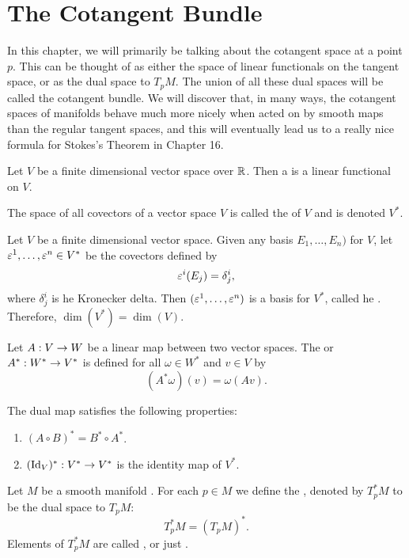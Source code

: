 \newpage\setcounter{section}{10}
\section{The Cotangent Bundle}

In this chapter, we will primarily be talking about the cotangent space at a point $p$. This can be thought of as either the space of linear functionals on the tangent space, or as the dual space to $T_pM$. The union of all these dual spaces will be called the cotangent bundle. We will discover that, in many ways, the cotangent spaces of manifolds behave much more nicely when acted on by smooth maps than the regular tangent spaces, and this will eventually lead us to a really nice formula for Stokes's Theorem in Chapter 16.


\dfn Let $V$ be a finite dimensional vector space over $\mathbb{R}$. Then a  is a linear functional on $V$.

\dfn The space of all covectors of a vector space $V$ is called the  of $V$ and is denoted $V^*$.

\begin{prop}
Let $V$ be a finite dimensional vector space. Given any basis $E_1,\ldots,E_n)$ for $V$, let $\varepsilon^1,\ldots,\varepsilon^n\in V^*$ be the covectors defined by
\[\varepsilon^i(E_j) = \delta^i_j,\]
where $\delta^i_j$ is he Kronecker delta. Then $(\varepsilon^1,\ldots,\varepsilon^n)$ is a basis for $V^*$, called he . Therefore, $\dim(V^*) = \dim(V)$.
\end{prop}

\dfn Let $A:V\rightarrow W$ be a linear map between two vector spaces. The  or  $A^*:W^*\rightarrow V^*$ is defined for all $\omega\in W^*$ and $v\in V$ by
\[(A^*\omega)(v) = \omega(Av).\]

\setcounter{thm}{3}

\begin{prop}
The dual map satisfies the following properties:
\begin{enumerate}
    \item $(A\circ B)^* = B^* \circ A^*$.
    \item $(\text{Id}_V)^*:V^*\rightarrow V^*$ is the identity map of $V^*$.
\end{enumerate}
\end{prop}

\dfn Let $M$ be a smooth manifold \wowob. For each $p\in M$ we define the , denoted by $T^*_pM$ to be the dual space to $T_pM$:
\[T^*_pM = (T_pM)^*.\]
Elements of $T^*_pM$ are called , or just .

